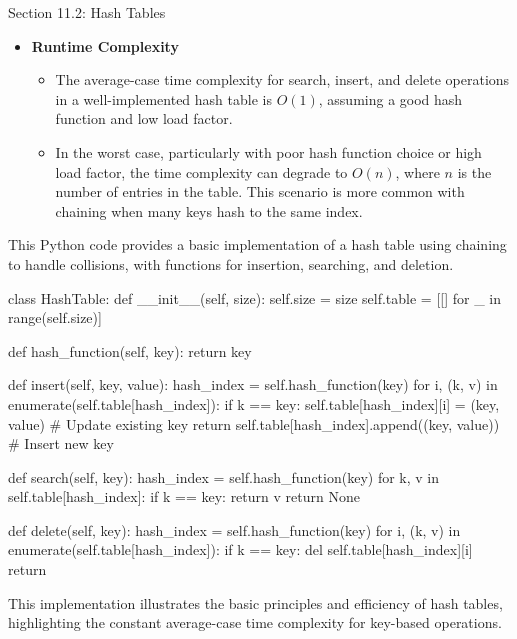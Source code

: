 \begin{notes}{Section 11.2: Hash Tables}
\begin{itemize}
        \item \textbf{Runtime Complexity}
        \begin{itemize}
            \item The average-case time complexity for search, insert, and delete operations in a well-implemented hash table is $O(1)$, assuming a good hash function and low load factor.
            \item In the worst case, particularly with poor hash function choice or high load factor, the time complexity can degrade to $O(n)$, where $n$ is the number of entries in the table. This 
            scenario is more common with chaining when many keys hash to the same index.
        \end{itemize}
    \end{itemize}
    
    \begin{highlight}
        This Python code provides a basic implementation of a hash table using chaining to handle collisions, with functions for insertion, searching, and deletion.
    \begin{code}[Python]
    class HashTable:
        def __init__(self, size):
            self.size = size
            self.table = [[] for _ in range(self.size)]
    
        def hash_function(self, key):
            return key %
    
        def insert(self, key, value):
            hash_index = self.hash_function(key)
            for i, (k, v) in enumerate(self.table[hash_index]):
                if k == key:
                    self.table[hash_index][i] = (key, value)  # Update existing key
                    return
            self.table[hash_index].append((key, value))  # Insert new key
    
        def search(self, key):
            hash_index = self.hash_function(key)
            for k, v in self.table[hash_index]:
                if k == key:
                    return v
            return None
    
        def delete(self, key):
            hash_index = self.hash_function(key)
            for i, (k, v) in enumerate(self.table[hash_index]):
                if k == key:
                    del self.table[hash_index][i]
                    return
    \end{code}
        This implementation illustrates the basic principles and efficiency of hash tables, highlighting the constant average-case time complexity for key-based operations.
    \end{highlight}
\end{notes}

